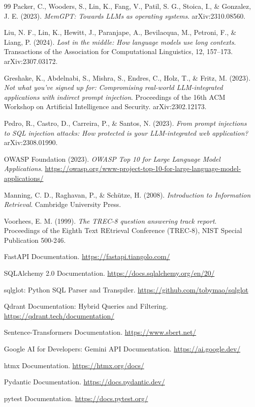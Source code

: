 \begin{thebibliography}{99}
Packer, C., Wooders, S., Lin, K., Fang, V., Patil, S. G., Stoica, I., \& Gonzalez, J. E. (2023).
\textit{MemGPT: Towards LLMs as operating systems}.
arXiv:2310.08560.

Liu, N. F., Lin, K., Hewitt, J., Paranjape, A., Bevilacqua, M., Petroni, F., \& Liang, P. (2024).
\textit{Lost in the middle: How language models use long contexts}.
Transactions of the Association for Computational Linguistics, 12, 157--173. arXiv:2307.03172.

Greshake, K., Abdelnabi, S., Mishra, S., Endres, C., Holz, T., \& Fritz, M. (2023).
\textit{Not what you've signed up for: Compromising real-world LLM-integrated applications with indirect prompt injection}.
Proceedings of the 16th ACM Workshop on Artificial Intelligence and Security. arXiv:2302.12173.

Pedro, R., Castro, D., Carreira, P., \& Santos, N. (2023).
\textit{From prompt injections to SQL injection attacks: How protected is your LLM-integrated web application?}
arXiv:2308.01990.

OWASP Foundation (2023).
\textit{OWASP Top 10 for Large Language Model Applications}.
\url{https://owasp.org/www-project-top-10-for-large-language-model-applications/}

Manning, C. D., Raghavan, P., \& Sch\"{u}tze, H. (2008).
\textit{Introduction to Information Retrieval}.
Cambridge University Press.

Voorhees, E. M. (1999).
\textit{The TREC-8 question answering track report}.
Proceedings of the Eighth Text REtrieval Conference (TREC-8), NIST Special Publication 500-246.

FastAPI Documentation.
\url{https://fastapi.tiangolo.com/}

SQLAlchemy 2.0 Documentation.
\url{https://docs.sqlalchemy.org/en/20/}

sqlglot: Python SQL Parser and Transpiler.
\url{https://github.com/tobymao/sqlglot}

Qdrant Documentation: Hybrid Queries and Filtering.
\url{https://qdrant.tech/documentation/}

Sentence-Transformers Documentation.
\url{https://www.sbert.net/}

Google AI for Developers: Gemini API Documentation.
\url{https://ai.google.dev/}

htmx Documentation.
\url{https://htmx.org/docs/}

Pydantic Documentation.
\url{https://docs.pydantic.dev/}

pytest Documentation.
\url{https://docs.pytest.org/}

\end{thebibliography}
